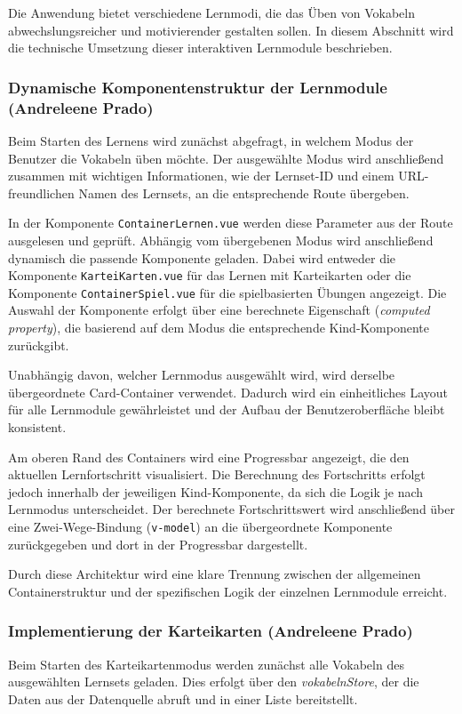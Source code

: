 Die Anwendung bietet verschiedene Lernmodi, die das Üben von Vokabeln abwechslungsreicher und motivierender gestalten sollen.
In diesem Abschnitt wird die technische Umsetzung dieser interaktiven Lernmodule beschrieben.

\subsubsection{Dynamische Komponentenstruktur der Lernmodule (Andreleene Prado)}
Beim Starten des Lernens wird zunächst abgefragt, in welchem Modus der Benutzer die Vokabeln üben möchte.
Der ausgewählte Modus wird anschließend zusammen mit wichtigen Informationen, wie der Lernset-ID und einem URL-freundlichen Namen des Lernsets, an die entsprechende Route übergeben.

In der Komponente \texttt{ContainerLernen.vue} werden diese Parameter aus der Route ausgelesen und geprüft.
Abhängig vom übergebenen Modus wird anschließend dynamisch die passende Komponente geladen.
Dabei wird entweder die Komponente \texttt{KarteiKarten.vue} für das Lernen mit Karteikarten oder die Komponente \texttt{ContainerSpiel.vue} für die spielbasierten Übungen angezeigt.
Die Auswahl der Komponente erfolgt über eine berechnete Eigenschaft (\textit{computed property}), die basierend auf dem Modus die entsprechende Kind-Komponente zurückgibt.

Unabhängig davon, welcher Lernmodus ausgewählt wird, wird derselbe übergeordnete Card-Container verwendet.
Dadurch wird ein einheitliches Layout für alle Lernmodule gewährleistet und der Aufbau der Benutzeroberfläche bleibt konsistent.

Am oberen Rand des Containers wird eine Progressbar angezeigt, die den aktuellen Lernfortschritt visualisiert.
Die Berechnung des Fortschritts erfolgt jedoch innerhalb der jeweiligen Kind-Komponente, da sich die Logik je nach Lernmodus unterscheidet.
Der berechnete Fortschrittswert wird anschließend über eine Zwei-Wege-Bindung (\texttt{v-model}) an die übergeordnete Komponente zurückgegeben und dort in der Progressbar dargestellt.

Durch diese Architektur wird eine klare Trennung zwischen der allgemeinen Containerstruktur und der spezifischen Logik der einzelnen Lernmodule erreicht.

\subsubsection{Implementierung der Karteikarten (Andreleene Prado)}
Beim Starten des Karteikartenmodus werden zunächst alle Vokabeln des ausgewählten Lernsets geladen.
Dies erfolgt über den \textit{vokabelnStore}, der die Daten aus der Datenquelle abruft und in einer Liste bereitstellt.

